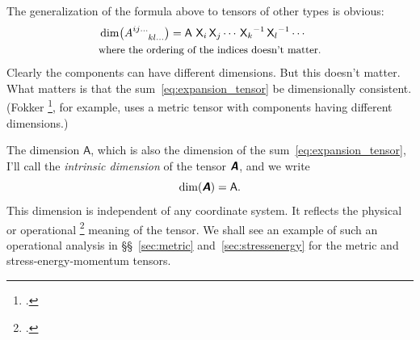 \documentclass[\ifafour a4paper,12pt,\else a5paper,10pt,\fi%
onecolumn,oneside,article,%
british%
]{memoir}
\theoremstyle{remark}
\theoremstyle{innote}
\newcommand*{\mathte}[1]{\textbf{\textit{\textsf{#1}}}}
\newcommand*{\citep}{\footcites}
\renewcommand*{\|}[1][]{\nonscript\,#1\vert\nonscript\;\mathopen{}}
\newcommand*{\sect}{\S}%
\newcommand*{\sects}{\S\S}%
\newcommand*{\Un}{\textsf{1}}
\newcommand*{\Le}{\textsf{L}}
\newcommand*{\Ti}{\textsf{T}}
\newcommand*{\Ma}{\textsf{M}}
\newcommand*{\Te}{\Theta}
\newcommand*{\Xx}{\textsf{X}}
\newcommand*{\Aa}{\textsf{A}}
\newcommand*{\yA}{\mathte{A}}
\renewcommand*{\i}{\indices}
\begin{document}
The generalization of the formula above to tensors of other types is obvious:
\begin{equation}
  \label{eq:dim_component_generic}
  \begin{aligned}
&\dim\bigl(A\i{^{ij\dotso}_{kl\dotso}}\bigr) = \Aa\ {\Xx_{i}}\,{\Xx_{j}}\dotsm\,
  {\Xx_{k}}^{-1}\,{\Xx_{l}}^{-1}\dotsm \\
  &\text{\small where the ordering of the indices doesn't matter.}
  \end{aligned}
\end{equation}
Clearly the components can have different dimensions. But this doesn't matter.
What matters is that the sum~\eqref{eq:expansion_tensor} be dimensionally
consistent. (Fokker \citep[\sect~VII.1 p.~88]{fokker1960_t1965}, for
example, uses a metric tensor with components having different dimensions.)

\medskip

The dimension $\Aa$, which is also the dimension of the
sum~\eqref{eq:expansion_tensor}, I'll call the \emph{intrinsic dimension}
of the tensor $\yA$, and we write
\begin{equation}
  \label{eq:abs_dim}
  \dim(\yA) = \Aa.
\end{equation}
This dimension is independent of any coordinate system. It reflects the
physical or operational \citep{bridgman1927_r1958}[see
also][\sect~A.2]{synge1960}[\sects~A.3--4]{truesdelletal1960} meaning of
the tensor. We shall see an example of such an operational analysis in
\sects~\ref{sec:metric} and~\ref{sec:stressenergy} for the metric and
stress-energy-momentum tensors.
\end{document}
